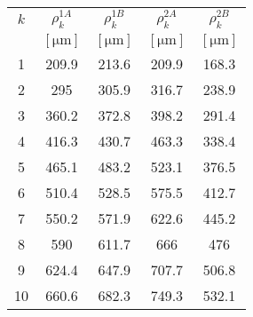 \begin{tabular}[t]{
  S[table-format = 2.0] 
  S[table-format = 3.1] 
  S[table-format = 3.1] 
  S[table-format = 3.1] 
  S[table-format = 3.1]
} \toprule
{$k$}            & {$\rho_k^{1A}$}         & {$\rho_k^{1B}$}         & {$\rho_k^{2A}$}         & {$\rho_k^{2B}$}         \\
                 & {$[\si{\micro\metre}]$} & {$[\si{\micro\metre}]$} & {$[\si{\micro\metre}]$} & {$[\si{\micro\metre}]$} \\                & 209.9                   & 213.6                   & 209.9                   & 168.3                   \\
2                & 295                     & 305.9                   & 316.7                   & 238.9                   \\
3                & 360.2                   & 372.8                   & 398.2                   & 291.4                   \\
4                & 416.3                   & 430.7                   & 463.3                   & 338.4                   \\
5                & 465.1                   & 483.2                   & 523.1                   & 376.5                   \\
6                & 510.4                   & 528.5                   & 575.5                   & 412.7                   \\
7                & 550.2                   & 571.9                   & 622.6                   & 445.2                   \\
8                & 590                     & 611.7                   & 666                     & 476                     \\
9                & 624.4                   & 647.9                   & 707.7                   & 506.8                   \\
10               & 660.6                   & 682.3                   & 749.3                   & 532.1                   \\\bottomrule
  \end{tabular}